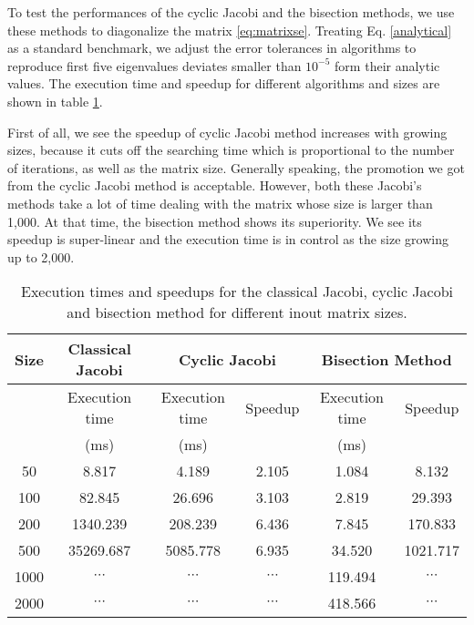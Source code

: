 
To test the performances of the cyclic Jacobi and the bisection methods, we use these methods to diagonalize the matrix \ref{eq:matrixse}. 
Treating Eq. \ref{analytical} as a standard benchmark, we adjust the error tolerances in algorithms to reproduce first five eigenvalues deviates smaller than $10^{-5}$ form their analytic values. 
The execution time and speedup for different algorithms and sizes are shown in table \ref{bisectiontab}. 

First of all, we see the speedup of cyclic Jacobi method increases with growing sizes, 
because it cuts off the searching time which is proportional to the number of iterations, as well as the matrix size. 
Generally speaking, the promotion we got from the cyclic Jacobi method is acceptable. 
However, both these Jacobi's methods take a lot of time dealing with the matrix whose size is larger than 1,000.
At that time, the bisection method shows its superiority. 
We see its speedup is super-linear and the execution time is in control as the size growing up to 2,000.
\begin{table}[]
\centering
\caption{Execution times and speedups for the classical Jacobi, cyclic Jacobi and bisection method for different inout matrix sizes.}
\label{bisectiontab}
\begin{tabular}{cccccc}
\hline
\hline
Size & Classical Jacobi & \multicolumn{2}{c}{Cyclic Jacobi} & \multicolumn{2}{c}{Bisection Method} \\
 \hline
     & Execution time   & Execution time       & Speedup     & Execution time    & Speedup  \\
     &(ms)   & (ms)      &     &(ms)   &  \\
 \hline
50   & 8.817            & 4.189               & 2.105       & 1.084            & 8.132      \\
100  & 82.845           & 26.696              & 3.103       & 2.819            & 29.393     \\
200  & 1340.239         & 208.239             & 6.436       & 7.845            & 170.833    \\
500  & 35269.687        & 5085.778            & 6.935       & 34.520           & 1021.717   \\
1000 &$\cdots$                  &$\cdots$                     &$\cdots$             & 119.494          &$\cdots$            \\
2000 &$\cdots$                  &$\cdots$                     &$\cdots$             & 418.566          & $\cdots$           \\
\hline
\hline
\end{tabular}
\end{table}
